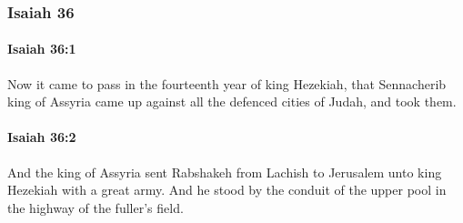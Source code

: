 	\subsubsection{Isaiah 36} %
		\label{ISAIAH-36}

		\paragraph{Isaiah 36:1} %
			\label{ISAIAH-36-1}

			Now it came to pass in the fourteenth year of king Hezekiah, that Sennacherib king of Assyria came up against all the defenced cities of Judah, and took them.


		\paragraph{Isaiah 36:2} %
			\label{ISAIAH-36-2}

			And the king of Assyria sent Rabshakeh from Lachish to Jerusalem unto king Hezekiah with a great army. And he stood by the conduit of the upper pool in the highway of the fuller's field.


